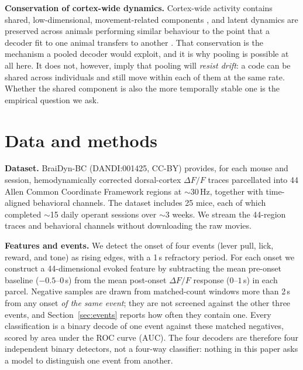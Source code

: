 \documentclass{article}
\newcommand{\auc}{\mathrm{AUC}}
\begin{document}
\textbf{Conservation of cortex-wide dynamics.} Cortex-wide activity contains shared,
low-dimensional, movement-related components \citep{musall2019,macdowell2020,macdowell2024}, and
latent dynamics are preserved across animals performing similar behaviour to the point that a decoder
fit to one animal transfers to another \citep{safaie2023}. That conservation is the mechanism a
pooled decoder would exploit, and it is why pooling is possible at all here. It does not, however,
imply that pooling will \emph{resist drift}: a code can be shared across individuals and still move
within each of them at the same rate. Whether the shared component is also the more temporally stable
one is the empirical question we ask.

\section{Data and methods}
\textbf{Dataset.} BraiDyn-BC \citep{kondo2025} (DANDI:001425, CC-BY) provides, for each mouse and
session, hemodynamically corrected dorsal-cortex $\Delta F/F$ traces parcellated into 44 Allen Common
Coordinate Framework regions at $\sim$30\,Hz, together with time-aligned behavioral channels. The
dataset includes 25 mice, each of which completed $\sim$15 daily operant sessions over $\sim$3 weeks.
We stream the 44-region traces and behavioral channels without downloading the raw movies.

\textbf{Features and events.} We detect the onset of four events (lever pull, lick, reward, and
tone) as rising edges, with a 1\,s refractory period. For each onset we construct a 44-dimensional
evoked feature by subtracting the mean pre-onset baseline ($-0.5$--$0$\,s) from the mean post-onset
$\Delta F/F$ response ($0$--$1$\,s) in each parcel. Negative samples are drawn from matched-count
windows more than 2\,s from any onset \emph{of the same event}; they are not screened against the
other three events, and Section~\ref{sec:events} reports how often they contain one. Every
classification is a binary decode of one event against these matched negatives, scored by area under
the ROC curve ($\auc$). The four decoders are therefore four independent binary detectors, not a
four-way classifier: nothing in this paper asks a model to distinguish one event from another.
\end{document}
